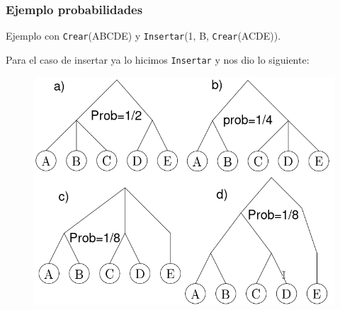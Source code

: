 \documentclass[10pt]{beamer}
\begin{document}

\begin{frame}
\frametitle{Ejemplo probabilidades}

Ejemplo con \texttt{Crear}(ABCDE) y \texttt{Insertar}(1, B, \texttt{Crear}(ACDE)).

Para el caso de insertar ya lo hicimos \texttt{Insertar} y nos dio lo siguiente:

\begin{figure}[h!]
    \centering
    \includegraphics[scale=0.3]{insertCreateRes.jpg}
\end{figure}

\end{frame}

\end{document}
